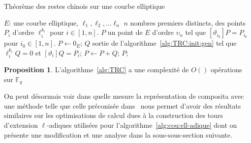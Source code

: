 \documentclass[10pt,a4paper]{book}
\theoremstyle{plain}
\theoremstyle{definition}
\theoremstyle{definition}
\theoremstyle{definition}
\newtheorem{prop}[thm]{Proposition}
\theoremstyle{definition}
\theoremstyle{remark}
\theoremstyle{remark}
\theoremstyle{definition}
\begin{document}
\begin{algorithm}
\caption{\label{alg:TRC} Théorème des restes chinois sur une courbe elliptique}
\begin{algorithmic}[1]
\REQUIRE $E$: une courbe elliptique, $\ell_1,\ell_2, \dots \ell_n$ $n$ nombres premiers distincts, des points $P_i$ d'ordre $\ell_i^{k_i}$ pour $i \in [1,n]$.
\ENSURE $P$ un point de $E$ d'ordre $\upsilon_n$  tel que $[\vartheta_{i_0} ] P=P_{i_0}$ pour $i_0 \in [1,n]$.
\STATE $P \leftarrow 0_E$;
\STATE $Q$ sortie de l'algorithme~\ref{alg:TRC:init:gen} tel que $\ell_i^{k_i}Q=0$ et $[\vartheta_i]Q=P_i$;
\STATE $P \leftarrow P+Q$; 
\ENDFOR
\RETURN $P$;
\end{algorithmic}
\end{algorithm}

\begin{prop}
L'algorithme~\ref{alg:TRC} a une complexité de $O()$ opérations sur $\mathbb{F}_q$
\end{prop}

 On peut désormais voir dans quelle mesure la représentation
  de composita avec une méthode telle que celle préconisée 
 dans~\cite{DeFeoDoliskaniSchost14} nous permet d'avoir des résultats 
 similaires sur les optimisations de calcul dues à la construction des tours 
 d'extension $\ell$-adiques utilisées pour 
 l'algorithme~\ref{alg:cou:ell-adique} dont on présente une modification et une
 analyse dans la sous-sous-section suivante. 
\end{document}
